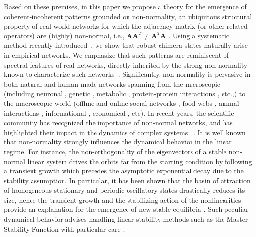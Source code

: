 \documentclass[prx,twocolumn,amsmath,noshowkeys,noshowpacs,amssymb]{revtex4-2}
\begin{document}
Based on these premises, in this paper we propose a theory for the emergence of coherent-incoherent patterns {grounded on non-normality, an ubiquitous structural property of} real-world networks for which the adjacency matrix (or other related operators) are (highly) non-normal, i.e., $\mathbf{AA}^T\neq\mathbf{A}^T\mathbf{A}$ \cite{Trefethen2005}. Using a systematic method recently introduced~\cite{Siebert, symm_break}, we show that robust chimera states naturally arise in empirical networks. We emphasize that such patterns are reminiscent of spectral features of real networks, directly inherited by the strong non-normality known to characterize such networks~\cite{asllani2018structure, OBrien_NN}. Significantly, non-normality is pervasive in both natural and human-made networks spanning from the microscopic (including neuronal \cite{ref68, ref69, ref70, Kaiser2006, ref54, ref66, ref67, ref68, ref28, ref43}, genetic \cite{ref55, Gerstein2012, ref59,  ref62, Sanz2011}, metabolic \cite{ref52}, protein-protein interactions \cite{Ewing2007}, etc.,) to the macroscopic world (offline and online social networks \cite{ref28, ref35, ref27, ref72, ref18, ref1, ref25, ref8, konect, Opsahl2009}, food webs \cite{Thompson2003, ref5, ref9, ref2, ref13, ref22, Bascompte2005, Ulanowicz1999, Christian1999, Goldwasser1993, Huxham1996, ref12, Dunne2008, ref21, ref36, ref73, ref74, Yodzis1998, ref32}, animal interactions \cite{ref44, ref45, ref46, ref47, ref48, ref49, ref50, ref51}, informational \cite{ref28, ref17, ref16, ref14, ref26, Milo2004}, economical \cite{ref42, ref31, ref30, ref60, ref61}, etc). {In recent years, the scientific community has recognized the importance of non-normal networks, and has highlighted their impact in the dynamics of complex systems ~\cite{Asllani2018PRE, asllani2018structure, OBrien_NN, Muolo2019, NN_stoch, baggio2020efficient, Johnson2020digraph, Muolo2021, Duan_Motter}.} It is well known that non-normality strongly influences the dynamical behavior in the linear regime. For instance, the non-orthogonality of the eigenvectors of a stable non-normal linear system drives the orbits far from the starting condition by following a transient growth which precedes the asymptotic exponential decay due to the stability assumption. In particular, it has been shown that the basin of attraction of homogeneous stationary and periodic oscillatory states drastically reduces its size, hence the transient growth and the stabilizing action of the nonlinearities provide an explanation for the emergence of new stable equilibria \cite{Asllani2018PRE, Muolo2019, Muolo2021}. Such peculiar dynamical behavior advises handling linear stability methods such as the Master Stability Function \cite{MSF} with particular care \cite{Muolo2021}. 
\end{document}
